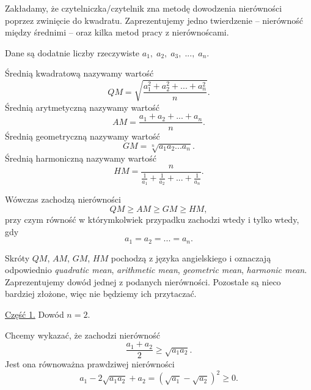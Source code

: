 

\noindent
Zakładamy, że czytelniczka/czytelnik zna metodę dowodzenia nierówności poprzez zwinięcie do kwadratu. Zaprezentujemy jedno twierdzenie -- nierówność między średnimi -- oraz kilka metod pracy z nierównoścami.

\vspace{10px}


\noindent
Dane są dodatnie liczby rzeczywiste $a_1,\; a_2, \; a_3, \; ..., \; a_n$.

\noindent
Średnią kwadratową nazywamy wartość
\[
    QM = \sqrt{\frac{a_1^2 + a_2^2 + ... + a_n^2}{n}}.
\]
Średnią arytmetyczną nazywamy wartość
\[
    AM = \frac{a_1 + a_2 + ... + a_n}{n}.
\]
Średnią geometryczną nazywamy wartość
\[
    GM = \sqrt[n]{a_1a_2...a_n}.
\]
Średnią harmoniczną nazywamy wartość
\[
   HM = \frac{n}{\frac{1}{a_1} + \frac{1}{a_2} + ... + \frac{1}{a_n}}.
\]

\noindent
Wówczas zachodzą nierówności
\[
    QM \geqslant AM \geqslant GM \geqslant HM,
\]
przy czym równość w którymkolwiek przypadku zachodzi wtedy i tylko wtedy, gdy
\[
    a_1 = a_2 = ... = a_n.
\]

\vspace{10px}
\noindent
Skróty $QM$, $AM$, $GM$, $HM$ pochodzą z języka angielskiego i oznaczają odpowiednio \textit{quadratic mean}, \textit{arithmetic mean}, \textit{geometric mean}, \textit{harmonic mean}. Zaprezentujemy dowód jednej z podanych nierówności. Pozostałe są nieco bardziej złożone, więc nie będziemy ich przytaczać.

\vspace{10px}


\noindent
\underline{Część 1.} Dowód $n = 2$.

\vspace{10px}

\noindent
Chcemy wykazać, że zachodzi nierówność
\[
    \frac{a_1 + a_2}{2} \geqslant \sqrt{a_1a_2}.
\]
Jest ona równoważna prawdziwej nierówności
\[
    a_1 - 2\sqrt{a_1a_2} + a_2 = (\sqrt{a_1} - \sqrt{a_2})^2 \geqslant 0.
\]

